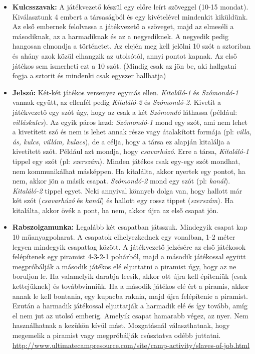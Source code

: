 \documentclass[a4paper, 12pt, twoside, openright]{article}
\begin{document}
\begin{itemize}
\item \textbf{Kulcsszavak:} A játékvezető készül egy előre leírt szöveggel (10-15 mondat). Kiválasztunk 4 embert a társaságból és egy kivételével mindenkit kiküldünk. Az első embernek felolvassa a játékvezető a szöveget, majd az elmeséli a másodiknak, az a harmadiknak és az a negyediknek. A negyedik pedig hangosan elmondja a történetet. Az elején meg kell jelölni 10 szót a sztoriban és ahány azok közül elhangzik az utolsótól, annyi pontot kapnak. Az első játékos sem ismerheti ezt a 10 szót. (Mindig csak az jön be, aki hallgatni fogja a sztorit és mindenki csak egyszer hallhatja)

\item \textbf{Jelszó:} Két-két játékos versenyez egymás ellen. \emph{Kitaláló-1} és \emph{Szómondó-1} vannak együtt, az ellenfél pedig \emph{Kitaláló-2} és \emph{Szómondó-2}. Kivetít a játékvezető egy szót úgy, hogy az csak a két \emph{Szómondó} láthassa (például: \emph{villáskulcs}). Az egyik páros kezd: \emph{Szómondó-1} mond egy szót, ami nem lehet a kivetített szó és nem is lehet annak része vagy átalakított formája (pl: \emph{villa, ás, kulcs, villám, kulacs}), de a célja, hogy a társa ez alapján kitalálja a kivetített szót. Például azt mondja, hogy \emph{csavarhúzó}. Erre a társa, \emph{Kitaláló-1} tippel egy szót (pl: \emph{szerszám}). Minden játékos csak egy-egy szót mondhat, nem kommunikálhat másképpen. Ha kitalálta, akkor nyertek egy pontot, ha nem, akkor jön a másik csapat. \emph{Szómondó-2} mond egy szót (pl: \emph{kanál}). \emph{Kitaláló-2} tippel egyet. Neki annyival könnyeb dolga van, hogy hallott már két szót (\emph{csavarhúzó} és \emph{kanál}) és hallott egy rossz tippet (\emph{szerszám}). Ha kitalálta, akkor övék a pont, ha nem, akkor újra az első csapat jön. 

\item \textbf{Rabszolgamunka:} Legalább két csapatban játsszuk. Mindegyik csapat kap 10 műanyagpoharat. A csapatok elhelyezkednek egy vonalban, 1-2 méter legyen mindegyik csapattag között. A játékvezető jelzésére az első játékosok felépítenek egy piramist 4-3-2-1 pohárból, majd a második játékossal együtt megpróbálják a második játékos elé eljuttatni a piramist úgy, hogy az ne boruljon le. Ha valamelyik darabja leesik, akkor ott újra kell építeniük  (csak kettejüknek) és továbbvinniük. Ha a második játékos elé ért a piramis, akkor annak le kell bontania, egy kupacba raknia, majd újra felépítenie a piramist. Ezután a harmadik játékossal eljuttatják a harmadik elé és így tovább, amíg el nem jut az utolsó emberig. Amelyik csapat hamarabb végez, az nyer. Nem használhatnak a kezükön kívül mást. Mozgatásnál választhatnak, hogy megemelik a piramist vagy megpróbálják csúsztatva odébb juttatni.
\url{http://www.ultimatecampresource.com/site/camp-activity/slaves-of-job.html}


\end{itemize}
\end{document}
